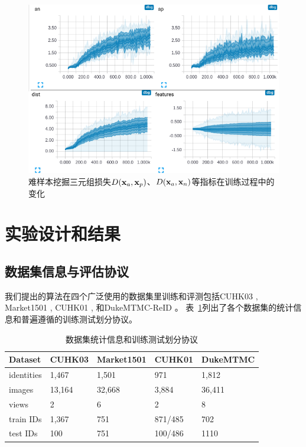 \begin{figure}
	\centering 
	\includegraphics[width=.9\textwidth]{fig/2018-05-19-23-10-33.png}
	\caption{难样本挖掘三元组损失$D({\mathbf{x}}_a,{\mathbf{x}}_p)$、$D({\mathbf{x}}_a,{\mathbf{x}}_n)$等指标在训练过程中的变化} \label{fig:triok}
\end{figure}

\section{实验设计和结果}

\subsection{数据集信息与评估协议}

我们提出的算法在四个广泛使用的数据集里训练和评测包括CUHK03 \cite{li2014deepreid}, 
Market1501 \cite{zheng2015scalable},  CUHK01 \cite{li2013locally}, 
和DukeMTMC-ReID \cite{zheng2017unlabeled} \cite{ristani2016MTMC} 。
表~\ref{table:dataset}列出了各个数据集的统计信息和普遍遵循的训练测试划分协议。

\begin{table}
	\centering
	\caption{数据集统计信息和训练测试划分协议}
	\label{table:dataset}
	\begin{tabular}{lllll}
		\toprule
		Dataset    & CUHK03 & Market1501 & CUHK01  & DukeMTMC \\
		\midrule
		identities & 1,467  & 1,501      & 971     & 1,812    \\
		images     & 13,164 & 32,668     & 3,884   & 36,411   \\
		views      & 2      & 6          & 2       & 8        \\
		train IDs  & 1,367  & 751        & 871/485 & 702      \\
		test IDs   & 100    & 751        & 100/486 & 1110     \\
		\bottomrule
	\end{tabular}
\end{table}

